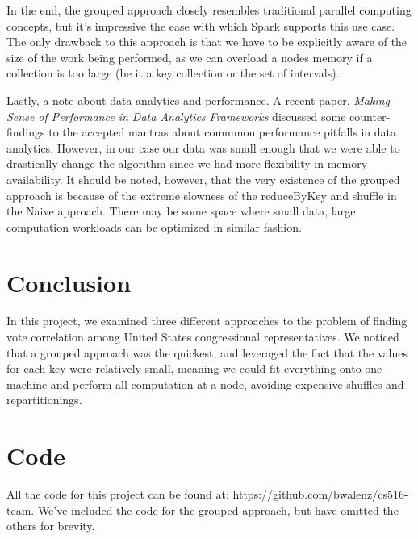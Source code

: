 \documentclass[11pt]{article}
\begin{document}
In the end, the grouped approach closely resembles traditional parallel computing concepts, but it's impressive the ease with which Spark supports this use case. The only drawback to this approach is that we have to be explicitly aware of the size of the work being performed, as we can overload a nodes memory if a collection is too large (be it a key collection or the set of intervals). 

Lastly, a note about data analytics and performance. A recent paper, \textit{Making Sense of Performance in Data Analytics Frameworks}\cite{ousterhoutmaking} discussed some counter-findings to the accepted mantras about commmon performance pitfalls in data analytics. However, in our case our data was small enough that we were able to drastically change the algorithm since we had more flexibility in memory availability. It should be noted, however, that the very existence of the grouped approach is because of the extreme slowness of the reduceByKey and shuffle in the Naive approach. There may be some space where small data, large computation workloads can be optimized in similar fashion.

\section{Conclusion}
In this project, we examined three different approaches to the problem of finding vote correlation among United States congressional representatives. We noticed that a grouped approach was the quickest, and leveraged the fact that the values for each key were relatively small, meaning we could fit everything onto one machine and perform all computation at a node, avoiding expensive shuffles and repartitionings. 




\appendix
\section{Code}
All the code for this project can be found at: https://github.com/bwalenz/cs516-team. We've included the code for the grouped approach, but have omitted the others for brevity. 
\end{document}
